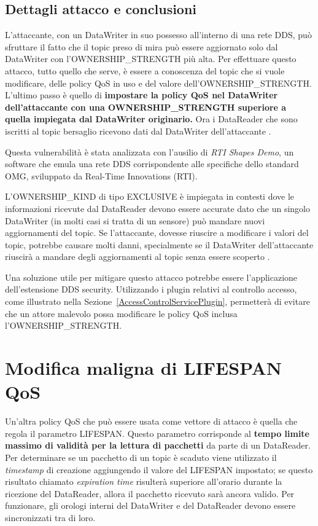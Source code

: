 \subsection{Dettagli attacco e conclusioni}
L'attaccante, con un DataWriter in suo possesso all'interno di una rete DDS,
può sfruttare il fatto che il topic preso di mira può essere aggiornato
solo dal DataWriter con l'OWNERSHIP\_STRENGTH più alta.
Per effettuare questo attacco, tutto quello che serve, è 
essere a conoscenza del topic che
si vuole modificare, delle policy QoS in uso e del valore 
dell'OWNERSHIP\_STRENGTH.
L'ultimo passo è quello di \textbf{impostare la policy QoS 
nel DataWriter
dell'attaccante con una OWNERSHIP\_STRENGTH 
superiore a quella impiegata dal
DataWriter originario.}
Ora i DataReader che sono iscritti al topic bersaglio
ricevono dati dal DataWriter dell'attaccante
\cite{DBLP:conf/malware/MichaudDL18}.


Questa vulnerabilità è stata analizzata con l'ausilio di \textit{RTI Shapes Demo}, 
un 
software che emula una rete DDS corrispondente alle specifiche 
dello standard OMG, sviluppato da Real-Time Innovations (RTI).

L'OWNERSHIP\_KIND di tipo EXCLUSIVE è impiegata in contesti dove le
informazioni ricevute dal DataReader devono essere accurate 
dato che un singolo
DataWriter (in molti casi si tratta di un sensore) può mandare nuovi 
aggiornamenti
del topic. Se l'attaccante, dovesse riuscire a modificare i valori del 
topic, potrebbe causare molti danni,
specialmente se il DataWriter dell'attaccante riuscirà a mandare 
degli aggiornamenti
al topic senza essere scoperto
\cite{DBLP:conf/malware/MichaudDL18}.

Una soluzione utile per mitigare questo attacco potrebbe essere
l'applicazione
dell'estensione DDS security. Utilizzando i plugin relativi 
al controllo accesso,
come illustrato nella Sezione~\ref{AccessControlServicePlugin}, 
permetterà
di evitare che un attore malevolo possa modificare le policy QoS inclusa 
l'OWNERSHIP\_STRENGTH.


\section{Modifica maligna di LIFESPAN QoS}

Un'altra policy QoS che può essere usata come vettore di attacco è quella
che regola il parametro LIFESPAN. Questo parametro 
corrisponde al \textbf{tempo limite massimo 
di validità per la
lettura di pacchetti} da parte di un DataReader. Per determinare se un pacchetto
di un topic è scaduto viene utilizzato il \textit{timestamp} di creazione
aggiungendo il valore del LIFESPAN impostato; se questo risultato chiamato 
\textit{expiration time} risulterà
superiore all'orario durante la ricezione del DataReader, allora il pacchetto
ricevuto sarà ancora valido. 
Per funzionare, gli orologi interni del DataWriter e del DataReader
devono essere sincronizzati tra di loro.


